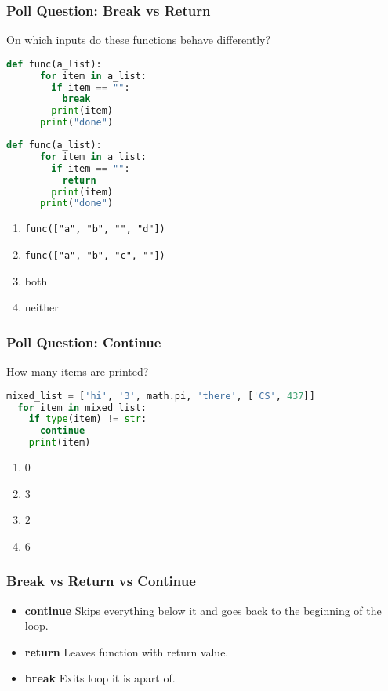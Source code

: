 \documentclass{beamer}
\begin{document}
%
%
\begin{frame}[fragile]
  \frametitle{Poll Question: Break vs Return}
  On which inputs do these functions behave differently?
  \centering
  \begin{minipage}{0.45\textwidth}
    \begin{lstlisting}[language=Python, autogobble]
    def func(a_list):
      for item in a_list:
        if item == "":
          break
        print(item)
      print("done")
    \end{lstlisting}
  \end{minipage}
  \hfill
  \begin{minipage}{0.45\textwidth}
    \begin{lstlisting}[language=Python, autogobble]
    def func(a_list):
      for item in a_list:
        if item == "":
          return 
        print(item)
      print("done")
    \end{lstlisting}
  \end{minipage}
  \vfill
  \begin{enumerate}[A]
    \item \lstinline|func(["a", "b", "", "d"])|
    \item \lstinline|func(["a", "b", "c", ""])|
    \item both
    \item neither
  \end{enumerate}
\end{frame}

%
%
\begin{frame}[fragile]
  \frametitle{Poll Question: Continue}
  How many items are printed?
  \begin{lstlisting}[language=Python, autogobble]
  mixed_list = ['hi', '3', math.pi, 'there', ['CS', 437]]
  for item in mixed_list:
    if type(item) != str:
      continue
    print(item)
  \end{lstlisting}
  \vfill
  \begin{enumerate}[A]
    \item 0
    \item 3
    \item 2
    \item 6
  \end{enumerate}
\end{frame}

%
%
\begin{frame}[fragile]
  \frametitle{Break vs Return vs Continue}
  \begin{itemize}
    \item \textbf{continue} \textrightarrow Skips everything below it and goes back to the beginning of the loop.
    \item \textbf{return} \textrightarrow Leaves function with return value.
    \item \textbf{break} \textrightarrow Exits loop it is apart of.
    \end{itemize}
\end{frame}
\end{document}

